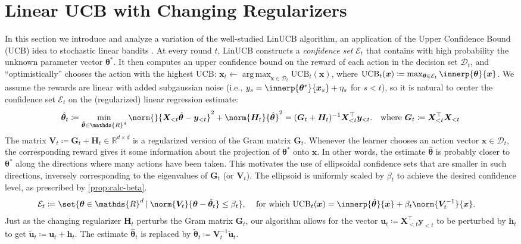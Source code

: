\documentclass{article}
\renewcommand{\vec}[1]{\bm{#1}}
\newcommand{\defeq}{\coloneq}
\newcommand{\inv}[1]{#1^{-1}}
\newcommand{\Real}{\mathds{R}}
\newcommand{\UCB}{\mathrm{UCB}}
\newcommand{\argmax}{\operatorname*{arg\,max}}
\newcommand\given[1][\delimsize]{%
  \providecommand{\delimsize}{}
  \nonscript\:#1\vert\allowbreak\nonscript\:\mathopen{}
}
\newcommand{\D}{\mathcal{D}}
\newcommand{\E}{\mathcal{E}}
\providecommand\transp{\top}
\let\transpsymbol\transp
\renewcommand{\transp}[1]{#1^\transpsymbol}
\newcommand{\XtX}[1]{\transp{#1}{#1}}
\begin{document}
\section{Linear UCB with Changing Regularizers}
\label{sec:LinUCB}

In this section we introduce and analyze a variation of
the well-studied LinUCB algorithm, an application of the Upper
Confidence Bound (UCB) idea to stochastic linear bandits
\citep{DaniStochasticLinearOptimization2008,RusmevichientongLinearlyParameterizedBandits2010,AbbasiYadkoriImprovedAlgorithmsLinear2011}.
At every round $t$, LinUCB constructs a \emph{confidence set} $\E_t$
that contains  with high probability the unknown parameter vector $\vec\theta^*$.  It then computes an upper confidence bound on the reward
of each action in the decision set $\D_t$, and ``optimistically''
chooses the action with the highest UCB:
$\vec x_t \gets \argmax_{\vec x\in\D_t} \UCB_t(\vec x)$, where
$\UCB_t(\vec x) \defeq \max_{\vec\theta\in\E_t}
\innerp{\vec\theta}{\vec x}$.  We assume the rewards are linear with
added subgaussian noise (i.e.,
$y_s = \innerp{\vec\theta^*}{\vec x_s} + \eta_s$ for $s<t$), so it is
natural to center the confidence set $\E_t$ on the (regularized)
linear regression estimate:
\begin{align*}
  \hat{\vec\theta}_t
  &\defeq \min_{\hat{\vec\theta} \in \Real^d} \norm{}{\vec X_{<t} \hat{\vec\theta}
    - \vec y_{<t}}^2 + \norm{\vec H_t}{\hat{\vec\theta}}^2
    = \inv{(\vec G_t + \vec H_t)} \transp{\vec X_{<t}} \vec y_{<t}.
    &\text{where } \vec G_t \defeq \XtX{\vec X_{<t}}
\end{align*}
The matrix $\vec V_t \defeq \vec G_t + \vec H_t \in \Real^{d\times d}$ is a regularized
version of the Gram matrix $\vec G_t$.  Whenever the learner chooses an
action vector $\vec x\in \D_t$, the corresponding reward gives it some information
about the projection of $\vec\theta^*$ onto $\vec x$.  In other
words, the estimate $\hat{\vec\theta}$ is probably closer to
$\vec\theta^*$ along the directions where many actions have
been taken.  This motivates the use of ellipsoidal confidence sets
that are smaller in such directions, inversely
corresponding to the eigenvalues of $\vec G_t$ (or $\vec V_t$). The ellipsoid
is uniformly scaled by $\beta_t$ to achieve the desired confidence
level, as prescribed by \cref{prop:calc-beta}.
\begin{align}\label{eq:def-ellip}
  \E_t &\defeq \set{\vec\theta\in\Real^d \given
        \norm{\vec V_t}{\vec\theta-\hat{\vec\theta}_t} \le \beta_t},
  &\text{ for which }
    \UCB_t(\vec x) &= \innerp{\hat{\vec\theta}}{\vec x} + \beta_t\norm{\inv{\vec V_t}}{\vec x}.
\end{align}
Just as the changing regularizer $\vec H_t$ perturbs the Gram matrix $\vec G_t$,
our algorithm allows for the vector
$\vec u_t \defeq \transp{\vec X_{<t}} \vec y_{<t}$ to be perturbed
by $\vec h_t$ to get
$\tilde{\vec u}_t \defeq \vec u_t + \vec h_t$.  The estimate
$\hat{\vec\theta}_t$ is replaced by
$\tilde{\vec\theta}_t \defeq \inv{\vec V_t}\tilde{\vec u}_t$.
\end{document}

